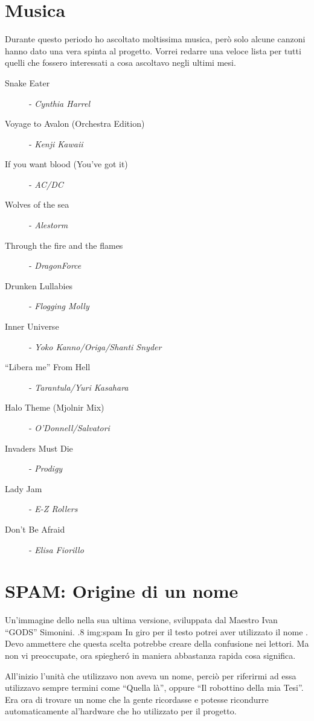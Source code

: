 \section*{Musica}
Durante questo periodo ho ascoltato moltissima musica, però solo alcune
canzoni hanno dato una vera spinta al progetto. Vorrei redarre una veloce
lista per tutti quelli che fossero interessati a cosa ascoltavo negli
ultimi mesi.
\begin{description}
    \item[Snake Eater]- \emph{Cynthia Harrel}
    \item[Voyage to Avalon (Orchestra Edition)] - \emph{Kenji Kawaii}
    \item[If you want blood (You've got it)] - \emph{AC/DC}
    \item[Wolves of the sea] - \emph{Alestorm}
    \item[Through the fire and the flames] - \emph{DragonForce}
    \item[Drunken Lullabies]- \emph{Flogging Molly}
    \item[Inner Universe] - \emph{Yoko Kanno/Origa/Shanti Snyder}
    \item[``Libera me'' From Hell] - \emph{Tarantula/Yuri Kasahara}
    \item[Halo Theme (Mjolnir Mix)] - \emph{O'Donnell/Salvatori}
    \item[Invaders Must Die] - \emph{Prodigy}
    \item[Lady Jam] - \emph{E-Z Rollers}
    \item[Don't Be Afraid] - \emph{Elisa Fiorillo}
\end{description}

\section*{SPAM: Origine di un nome}
        {Un'immagine dello \SPAM{} nella sua ultima versione,
            sviluppata dal Maestro Ivan ``GODS'' Simonini.}
        {.8}
        {img:spam}
In giro per il testo potrei aver utilizzato il nome \SPAM{}. Devo ammettere
che questa scelta potrebbe creare della confusione nei lettori. Ma non vi
preoccupate, ora spiegher\'o in maniera abbastanza rapida cosa significa.

All'inizio l'unità  che utilizzavo non aveva un nome, perciò
per riferirmi ad essa utilizzavo sempre termini come ``Quella là'', oppure
``Il robottino della mia Tesi''. Era ora di trovare un nome che la gente
ricordasse e potesse ricondurre automaticamente al'hardware che ho
utilizzato per il progetto.

